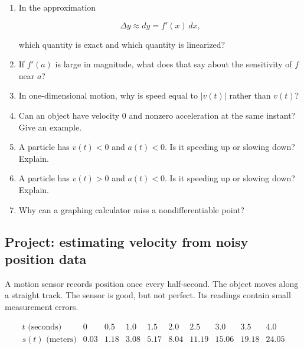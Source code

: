 \begin{enumerate}
\item In the approximation

\[
\Delta y\approx dy=f'(x)\,dx,
\]

which quantity is exact and which quantity is linearized?

\item If \(f'(a)\) is large in magnitude, what does that say about the sensitivity of \(f\) near \(a\)?

\item In one-dimensional motion, why is speed equal to \(|v(t)|\) rather than \(v(t)\)?

\item Can an object have velocity \(0\) and nonzero acceleration at the same instant?  Give an example.

\item A particle has \(v(t)<0\) and \(a(t)<0\).  Is it speeding up or slowing down?  Explain.

\item A particle has \(v(t)>0\) and \(a(t)<0\).  Is it speeding up or slowing down?  Explain.

\item Why can a graphing calculator miss a nondifferentiable point?
\end{enumerate}

\subsection{Project: estimating velocity from noisy position data}
\label{subsec:project-noisy-position-data}

A motion sensor records position once every half-second.  The object moves along a straight track.  The sensor is good, but not perfect.  Its readings contain small measurement errors.

\[
\begin{array}{c|ccccccccc}
t\text{ (seconds)} & 0 & 0.5 & 1.0 & 1.5 & 2.0 & 2.5 & 3.0 & 3.5 & 4.0 \\ \hline
s(t)\text{ (meters)} & 0.03 & 1.18 & 3.08 & 5.17 & 8.04 & 11.19 & 15.06 & 19.18 & 24.05
\end{array}
\]

